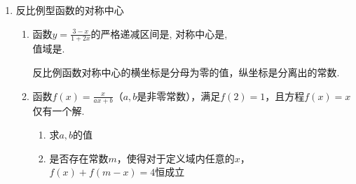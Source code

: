 \begin{enumerate}
\begin{enumerate}
\begin{enumerate}
            \item 函数$f(x)$的图像过点$(1, 3)$，且$f(x)$的图像和$x$轴负半轴有两个交点，求实数$a$的取值范围
        \end{enumerate}
        \begin{jieda}
            \begin{enumerate}
            \item 当$a = 0$，$f(x) = \frac{x^2+x+c}{x} = x + 1 + \frac{c}{x} (x \neq 0)$， $f(1) + f(-1) = 2 \neq 0$，故不存在$c$使得$f(x)$为奇函数.
            \item $f(1) = \frac{2+3a+c}{1+a} = 3$, 故$c = 1, f(x) = \frac{x^2+(3a+1)x+1}{x+a}$. 函数的零点是函数的分子部分的零点子集，故$g(x) = x^2+(3a+1)x+1 (x \neq -a)$与$x$轴负半轴有两个交点$x_1, x_2$。
            \begin{equation*}
            \left\{ 
                \begin{array}{l}  
                    \Delta = (3a+1)^2 - 4 > 0, \\ 
                    x_1 + x_2 = -(3a + 1) < 0, \\
                     a^2 - (3a+1)a + 1 \neq 0.
                 \end{array}
            \right \quad
            \end{equation*}
            解得$a > \frac{1}{3} \mbox{且} a \neq \frac{1}{2}$
        \end{enumerate}
        \ps 否定一个函数是奇函数可以通过举反例.
        \end{jieda}
    \end{enumerate}
    \item 反比例型函数的对称中心
    \begin{enumerate}
        \item 函数$y=\frac{3-x}{1+2x}$的严格递减区间是, 对称中心是, \\
        值域是. 
        \begin{jieda}
            反比例函数对称中心的横坐标是分母为零的值，纵坐标是分离出的常数.
        \end{jieda}
        \item 函数$f(x) = \frac{x}{ax+b}$（$a, b$是非零常数），满足$f(2) = 1$，且方程$f(x) = x$仅有一个解.
        \begin{enumerate}
            \item 求$a, b$的值
            \item 是否存在常数$m$，使得对于定义域内任意的$x$，$f(x) + f(m-x) = 4$恒成立

\end{enumerate}
\end{enumerate}
\end{enumerate}
